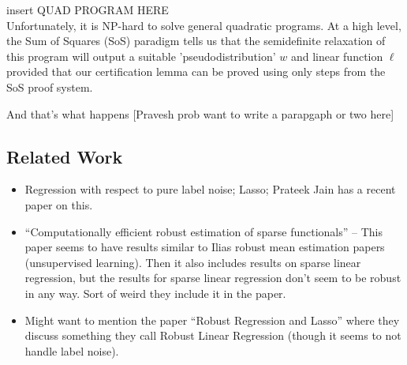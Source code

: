 insert QUAD PROGRAM HERE\\

Unfortunately, it is NP-hard to solve general quadratic programs.  At
a high level, the Sum of Squares (SoS) paradigm tells us that the
semidefinite relaxation of this program will output a suitable
'pseudodistribution' $w$ and linear function $\ell$ provided that our
certification lemma can be proved using only steps from the SoS proof
system.

And that's what happens [Pravesh prob want to write a parapgaph or two here]

\subsection{Related Work}

\begin{itemize}

\item Regression with respect to pure label noise; Lasso; Prateek Jain
  has a recent paper on this. 

\item ``Computationally efficient robust estimation of sparse
  functionals'' -- This paper seems to have results similar to Ilias
  robust mean estimation papers (unsupervised learning).  Then it also
  includes results on sparse linear regression, but the results for
  sparse linear regression don't seem to be robust in any way. Sort of
  weird they include it in the paper.

\item Might want to mention the paper ``Robust Regression and Lasso''
  where they discuss something they call Robust Linear Regression
  (though it seems to not handle label noise). 

\end{itemize}

